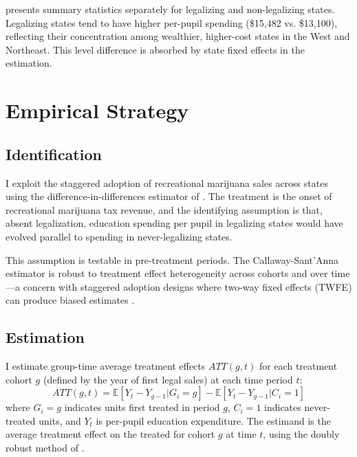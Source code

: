 \documentclass[12pt]{article}
\newcommand{\E}{\mathbb{E}}
\begin{document}


 presents summary statistics separately for legalizing and non-legalizing states. Legalizing states tend to have higher per-pupil spending (\$15,482 vs. \$13,100), reflecting their concentration among wealthier, higher-cost states in the West and Northeast. This level difference is absorbed by state fixed effects in the estimation.


\section{Empirical Strategy}

\subsection{Identification}

I exploit the staggered adoption of recreational marijuana sales across states using the difference-in-differences estimator of \citet{callaway2021difference}. The treatment is the onset of recreational marijuana tax revenue, and the identifying assumption is that, absent legalization, education spending per pupil in legalizing states would have evolved parallel to spending in never-legalizing states.

This assumption is testable in pre-treatment periods. The Callaway-Sant'Anna estimator is robust to treatment effect heterogeneity across cohorts and over time---a concern with staggered adoption designs where two-way fixed effects (TWFE) can produce biased estimates \citep{goodman2021difference, sun2021estimating}.

\subsection{Estimation}

I estimate group-time average treatment effects $ATT(g,t)$ for each treatment cohort $g$ (defined by the year of first legal sales) at each time period $t$:
\begin{equation}
ATT(g,t) = \E[Y_{t} - Y_{g-1} | G_i = g] - \E[Y_{t} - Y_{g-1} | C_i = 1]
\end{equation}
where $G_i = g$ indicates units first treated in period $g$, $C_i = 1$ indicates never-treated units, and $Y_t$ is per-pupil education expenditure. The estimand is the average treatment effect on the treated for cohort $g$ at time $t$, using the doubly robust method of \citet{sant2020doubly}.
\end{document}
